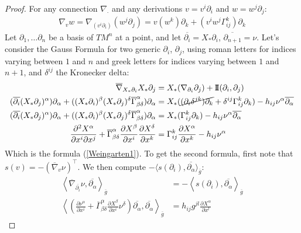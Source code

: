 \begin{proof}
	For any connection $\nabla_\cdot$ and any derivations $v=v^i \partial_i$ and $w=w^j \partial_j$:
	\begin{align*}
		\nabla_{v} w = \nabla_{(v^i \partial_i)} (w^j \partial_j) = v(w^k)\partial_k + (v^i w^j \Gamma^{k}_{ij})\partial_k
	\end{align*}
	Let $\partial_1, \dots \partial_n$ be a basis of $TM^n$ at a point, and let $\overline{\partial_i} = X_*\partial_i$, $\overline{\partial_{n+1}}=\nu$.
	Let's consider the Gauss Formula for two generic $\partial_i$, $\partial_j$, using roman letters for indices varying between $1$ and $n$ and greek letters for indices varying between $1$ and $n+1$, and $\delta^{ij}$ the Kronecker delta:
	\begin{align*}
		\overline{\nabla}_{X_*\partial_i} X_* \partial_j &= X_* (\nabla_{\partial_i} \partial_j)  + \mathrm{I\!I} (\partial_i, \partial_j) \\
		(\overline{\partial_i}(X_*\partial_j)^\alpha) \partial_\alpha + ((X_*\partial_i)^\beta (X_*\partial_j)^\delta \overline{ \Gamma}^{\alpha}_{\beta \delta})\partial_\alpha &= X_* (\cancel{(\partial_i \delta^{jk})\partial_k} +  \delta^{ij}\Gamma^{k}_{ij}\partial_k)  - h_{ij}\nu^\alpha \overline{\partial_\alpha}\\
		(\overline{\partial_i}(X_*\partial_j)^\alpha) \partial_\alpha + ((X_*\partial_i)^\beta (X_*\partial_j)^\delta\overline{ \Gamma}^{\alpha}_{\beta\delta})\partial_\alpha &= X_* (\Gamma^{k}_{ij}\partial_k)  - h_{ij}\nu^\alpha \overline{\partial_\alpha}\\
		\frac{\partial^2 X^\alpha}{\partial x^i \partial x^j} +\overline{\Gamma}^\alpha_{\beta \delta}\frac{\partial X^\beta}{\partial x^i}\frac{\partial X^\delta}{\partial x^k}&=\Gamma^k_{ij}\frac{\partial X^\alpha}{\partial x^k}-h_{ij}\nu^\alpha
	\end{align*}
	Which is the formula (\ref{Weingarten1}). 
	To get the second formula, first note that $s(v) = -(\overline{\nabla}_v \nu)^\top$. We then compute $-\langle s(\partial_i), \overline{\partial_\alpha}\rangle_{\overline{g}}$:
	\begin{align*}
		\left\langle\overline{\nabla}_{\overline{\partial_i}} \nu, \overline{\partial_\alpha}\right\rangle_{\overline{g}} &= -\left\langle s(\partial_i), \overline{\partial_\alpha}\right\rangle_{\overline{g}}\\
		\left\langle \left(\frac{\partial \nu^\alpha}{\partial x^i}+\overline{\Gamma}^\alpha_{\beta \delta}\frac{\partial X^\beta}{\partial x^i} \nu^\delta \right)\overline{\partial_\alpha}, \overline{\partial_\alpha} \right\rangle_{\overline{g}}&= h_{ij}g^{jl}\frac{\partial X^\alpha}{\partial x^l}

\end{align*}
\end{proof}
